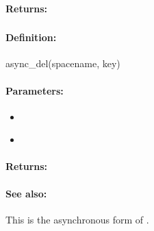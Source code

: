 \paragraph{Returns:}


\pagebreak
\subsubsection{}
\label{api:ruby:async_del}


\paragraph{Definition:}
\begin{rubycode}
async_del(spacename, key)
\end{rubycode}

\paragraph{Parameters:}
\begin{itemize}[noitemsep]
\item {}\\

\item {}\\

\end{itemize}

\paragraph{Returns:}


\paragraph{See also:}  This is the asynchronous form of .

\pagebreak
\subsubsection{}
\label{api:ruby:cond_del}


